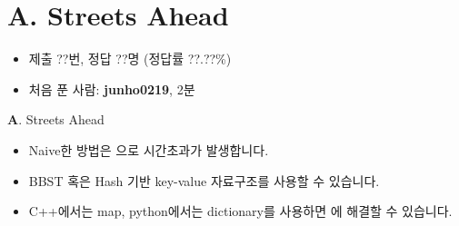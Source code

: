 \section{A. Streets Ahead}

\begin{frame} %
    \begin{itemize}
        \item 제출 ??번, 정답 ??명 (정답률 ??.??\%)
        \item 처음 푼 사람: \textbf{junho0219}, 2분
    \end{itemize}
\end{frame}

\begin{frame}{\textbf{A}. Streets Ahead}
    \begin{itemize}
        \item Naive한 방법은 으로 시간초과가 발생합니다.
        \item BBST 혹은 Hash 기반 key-value 자료구조를 사용할 수 있습니다.
        \item C++에서는 map, python에서는 dictionary를 사용하면 에 해결할 수 있습니다. 
    \end{itemize}
\end{frame}